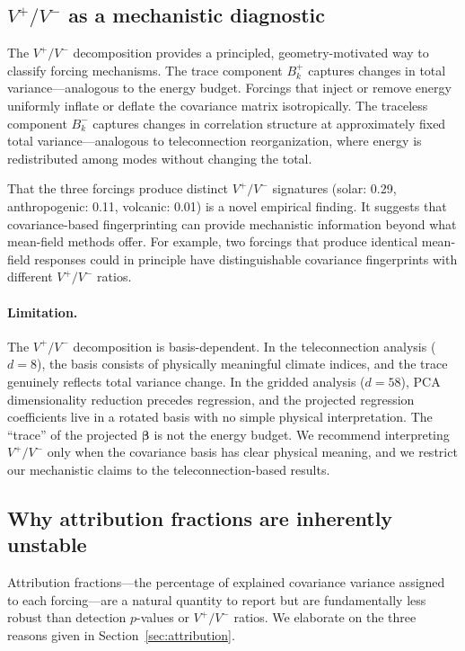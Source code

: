\documentclass[preprint,12pt]{elsarticle}
\begin{document}
\subsection{$V^+/V^-$ as a mechanistic diagnostic}\label{sec:vpvm_discuss}

The $V^+/V^-$ decomposition provides a principled, geometry-motivated way to classify forcing mechanisms.
The trace component $B_k^+$ captures changes in total variance---analogous to the energy budget.
Forcings that inject or remove energy uniformly inflate or deflate the covariance matrix isotropically.
The traceless component $B_k^-$ captures changes in correlation structure at approximately fixed total variance---analogous to teleconnection reorganization, where energy is redistributed among modes without changing the total.

That the three forcings produce distinct $V^+/V^-$ signatures (solar: 0.29, anthropogenic: 0.11, volcanic: 0.01) is a novel empirical finding.
It suggests that covariance-based fingerprinting can provide mechanistic information beyond what mean-field methods offer.
For example, two forcings that produce identical mean-field responses could in principle have distinguishable covariance fingerprints with different $V^+/V^-$ ratios.

\paragraph{Limitation.}
The $V^+/V^-$ decomposition is basis-dependent.
In the teleconnection analysis ($d=8$), the basis consists of physically meaningful climate indices, and the trace genuinely reflects total variance change.
In the gridded analysis ($d=58$), PCA dimensionality reduction precedes regression, and the projected regression coefficients live in a rotated basis with no simple physical interpretation.
The ``trace'' of the projected $\bm{\beta}$ is not the energy budget.
We recommend interpreting $V^+/V^-$ only when the covariance basis has clear physical meaning, and we restrict our mechanistic claims to the teleconnection-based results.

\subsection{Why attribution fractions are inherently unstable}\label{sec:attrib_discuss}

Attribution fractions---the percentage of explained covariance variance assigned to each forcing---are a natural quantity to report but are fundamentally less robust than detection $p$-values or $V^+/V^-$ ratios.
We elaborate on the three reasons given in Section~\ref{sec:attribution}.
\end{document}
